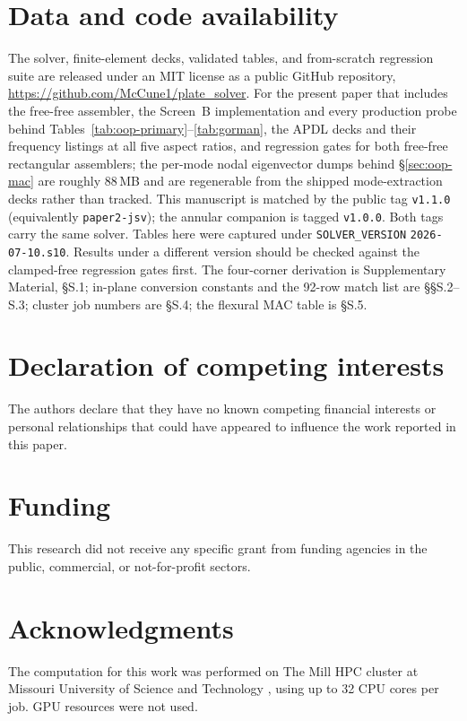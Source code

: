 \documentclass[11pt]{article}
\begin{document}
\small
\section*{Data and code availability}
The solver, finite-element decks, validated tables, and from-scratch
regression suite are released under an MIT license as a public GitHub
repository, \url{https://github.com/McCune1/plate_solver}. For the present
paper that includes the free-free assembler, the Screen~B implementation
and every production probe behind
Tables~\ref{tab:oop-primary}--\ref{tab:gorman}, the APDL decks and their
frequency listings at all five aspect ratios, and regression gates for both
free-free rectangular assemblers; the per-mode nodal eigenvector dumps
behind \S\ref{sec:oop-mac} are roughly $88$\,MB and are regenerable from
the shipped mode-extraction decks rather than tracked. This
manuscript is matched by the public tag \texttt{v1.1.0} (equivalently
\texttt{paper2-jsv}); the annular companion \cite{mccune2026annular} is
tagged \texttt{v1.0.0}. Both tags carry the same solver. Tables here were captured under
\texttt{SOLVER\_VERSION} \texttt{2026-07-10.s10}. Results under a
different version should be checked against the clamped-free regression
gates first. The four-corner derivation is Supplementary Material, \S{}S.1;
in-plane conversion constants and the 92-row match list are \S\S{}S.2--S.3;
cluster job numbers are \S{}S.4; the flexural MAC table is \S{}S.5.

\section*{Declaration of competing interests}
The authors declare that they have no known competing financial interests
or personal relationships that could have appeared to influence the work
reported in this paper.

\section*{Funding}
This research did not receive any specific grant from funding agencies in
the public, commercial, or not-for-profit sectors.

\section*{Acknowledgments}
The computation for this work was performed on The Mill HPC cluster at
Missouri University of Science and Technology \cite{mill2024}, using up
to 32 CPU cores per job. GPU resources were not used.
\end{document}
